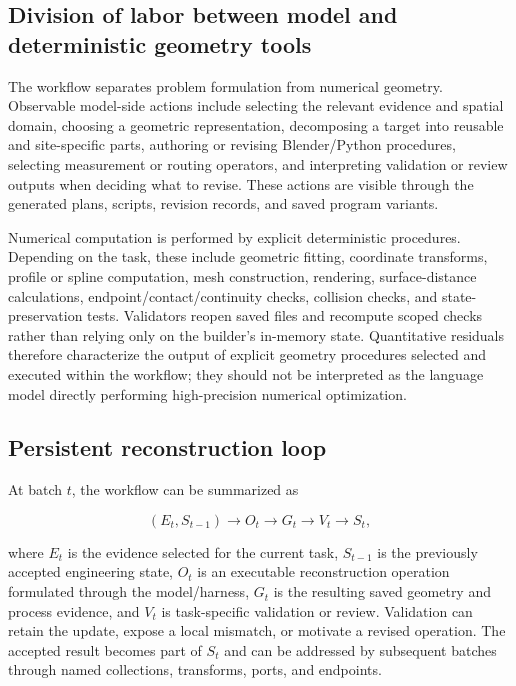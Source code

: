 \documentclass[10pt,a4paper]{article}
\begin{document}
\hypertarget{division-of-labor-between-model-and-deterministic-geometry-tools}{%
\subsection{Division of labor between model and deterministic geometry
tools}\label{division-of-labor-between-model-and-deterministic-geometry-tools}}

The workflow separates problem formulation from numerical geometry.
Observable model-side actions include selecting the relevant evidence
and spatial domain, choosing a geometric representation, decomposing a
target into reusable and site-specific parts, authoring or revising
Blender/Python procedures, selecting measurement or routing operators,
and interpreting validation or review outputs when deciding what to
revise. These actions are visible through the generated plans, scripts,
revision records, and saved program variants.

Numerical computation is performed by explicit deterministic procedures.
Depending on the task, these include geometric fitting, coordinate
transforms, profile or spline computation, mesh construction, rendering,
surface-distance calculations, endpoint/contact/continuity checks,
collision checks, and state-preservation tests. Validators reopen saved
files and recompute scoped checks rather than relying only on the
builder's in-memory state. Quantitative residuals therefore characterize
the output of explicit geometry procedures selected and executed within
the workflow; they should not be interpreted as the language model
directly performing high-precision numerical optimization.

\hypertarget{persistent-reconstruction-loop}{%
\subsection{Persistent reconstruction
loop}\label{persistent-reconstruction-loop}}

At batch \(t\), the workflow can be summarized as

\[
(E_t, S_{t-1}) \rightarrow O_t \rightarrow G_t \rightarrow V_t \rightarrow S_t,
\]

where \(E_t\) is the evidence selected for the current task, \(S_{t-1}\)
is the previously accepted engineering state, \(O_t\) is an executable
reconstruction operation formulated through the model/harness, \(G_t\)
is the resulting saved geometry and process evidence, and \(V_t\) is
task-specific validation or review. Validation can retain the update,
expose a local mismatch, or motivate a revised operation. The accepted
result becomes part of \(S_t\) and can be addressed by subsequent
batches through named collections, transforms, ports, and endpoints.
\end{document}
